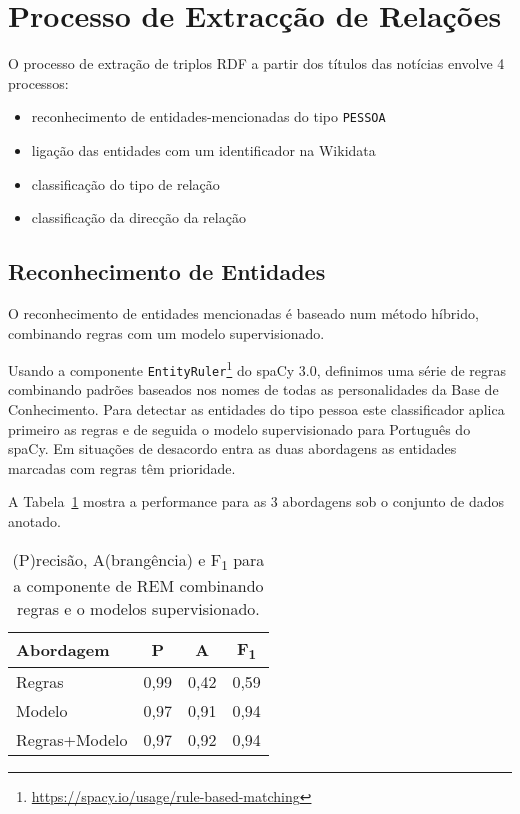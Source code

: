 \documentclass[a4paper, twocolumn, 11pt, twoside]{article}
\begin{document}
\section{Processo de Extracção de Relações}
\label{sec:classifiers}

O processo de extração de triplos RDF a partir dos títulos das notícias envolve 4 processos:

\begin{itemize}
\item reconhecimento de entidades-mencionadas do tipo \texttt{PESSOA}
\item ligação das entidades com um identificador na Wikidata
\item classificação do tipo de relação
\item classificação da direcção da relação
\end{itemize}

\subsection{Reconhecimento de Entidades}
\label{subsec:ner}


O reconhecimento de entidades mencionadas é baseado num método híbrido, combinando regras com um modelo supervisionado.

Usando a componente \texttt{EntityRuler}\footnote{\url{https://spacy.io/usage/rule-based-matching}} do spaCy 3.0, definimos uma série de regras combinando padrões baseados nos nomes de todas as personalidades da Base de Conhecimento. Para detectar as entidades do tipo pessoa este classificador aplica primeiro as regras e de seguida o modelo supervisionado para Português do spaCy. Em situações de desacordo entra as duas abordagens as entidades marcadas com regras têm prioridade.

A Tabela~\ref{tab:results_ner} mostra a performance para as 3 abordagens sob o conjunto de dados anotado.


\begin{table}
    \begin{center}
    \begin{tabular}{l ccc}
		{\bf Abordagem}  & {\bf P} & {\bf A} & {\bf F\textsubscript{1}} \\
        \hline
        Regras           &  0,99     &  0,42     & 		0,59		\\
        Modelo           &  0,97     &  0,91     & 		0,94		\\
		Regras+Modelo    &  0,97     &  0,92     & 		0,94		\\
    \end{tabular}
	\caption{ (P)recisão, A(brangência) e F\textsubscript{1} para a componente de REM combinando regras e o modelos supervisionado.}	
	\label{tab:results_ner}
	\end{center}
\end{table}
\end{document}
